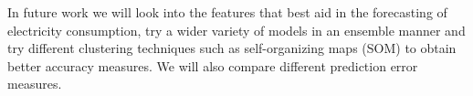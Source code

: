 In future work we will look into the features that best aid in the forecasting of electricity consumption, try a wider variety of models in an ensemble manner and try different clustering techniques such as self-organizing maps (SOM) to obtain better accuracy measures. We will also compare different prediction error measures.


